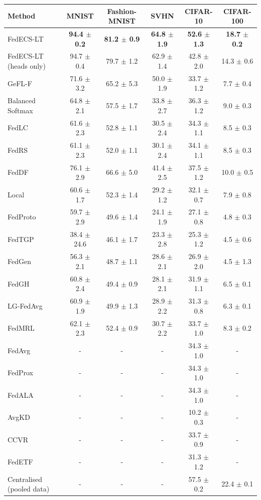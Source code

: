 \begin{tabular}{lccccc}
\toprule
Method & MNIST & Fashion-MNIST & SVHN & CIFAR-10 & CIFAR-100\\
\midrule
FedECS-LT & \textbf{94.4 $\pm$ 0.2} & \textbf{81.2 $\pm$ 0.9} & \textbf{64.8 $\pm$ 1.9} & \textbf{52.6 $\pm$ 1.3} & \textbf{18.7 $\pm$ 0.2}\\
FedECS-LT (heads only) & 94.7 $\pm$ 0.4 & 79.7 $\pm$ 1.2 & 62.9 $\pm$ 1.4 & 42.8 $\pm$ 2.0 & 14.3 $\pm$ 0.6\\
GeFL-F & 71.6 $\pm$ 3.2 & 65.2 $\pm$ 5.3 & 50.0 $\pm$ 1.9 & 33.7 $\pm$ 1.2 & 7.7 $\pm$ 0.4\\
Balanced Softmax & 64.8 $\pm$ 2.1 & 57.5 $\pm$ 1.7 & 33.8 $\pm$ 2.7 & 36.3 $\pm$ 1.2 & 9.0 $\pm$ 0.3\\
FedLC & 61.6 $\pm$ 2.3 & 52.8 $\pm$ 1.1 & 30.5 $\pm$ 2.4 & 34.3 $\pm$ 1.1 & 8.5 $\pm$ 0.3\\
FedRS & 61.1 $\pm$ 2.3 & 52.0 $\pm$ 1.1 & 30.1 $\pm$ 2.4 & 34.1 $\pm$ 1.1 & 8.5 $\pm$ 0.3\\
FedDF & 76.1 $\pm$ 2.9 & 66.6 $\pm$ 5.0 & 41.4 $\pm$ 2.5 & 37.5 $\pm$ 1.2 & 10.0 $\pm$ 0.5\\
Local & 60.6 $\pm$ 1.7 & 52.3 $\pm$ 1.4 & 29.2 $\pm$ 1.2 & 32.1 $\pm$ 0.7 & 7.9 $\pm$ 0.8\\
FedProto & 59.7 $\pm$ 2.9 & 49.6 $\pm$ 1.4 & 24.1 $\pm$ 1.9 & 27.1 $\pm$ 0.8 & 4.8 $\pm$ 0.3\\
FedTGP & 38.4 $\pm$ 24.6 & 46.1 $\pm$ 1.7 & 23.3 $\pm$ 2.8 & 25.3 $\pm$ 1.2 & 4.5 $\pm$ 0.6\\
FedGen & 56.3 $\pm$ 2.1 & 48.7 $\pm$ 1.1 & 28.6 $\pm$ 2.1 & 26.9 $\pm$ 2.0 & 4.5 $\pm$ 1.3\\
FedGH & 60.8 $\pm$ 2.4 & 49.4 $\pm$ 0.9 & 28.1 $\pm$ 2.1 & 31.9 $\pm$ 1.1 & 6.5 $\pm$ 0.1\\
LG-FedAvg & 60.9 $\pm$ 1.9 & 49.9 $\pm$ 1.3 & 28.9 $\pm$ 2.2 & 31.3 $\pm$ 0.8 & 6.3 $\pm$ 0.1\\
FedMRL & 62.1 $\pm$ 2.3 & 52.4 $\pm$ 0.9 & 30.7 $\pm$ 2.2 & 33.7 $\pm$ 1.0 & 8.3 $\pm$ 0.2\\
FedAvg & - & - & - & 34.3 $\pm$ 1.0 & -\\
FedProx & - & - & - & 34.3 $\pm$ 1.0 & -\\
FedALA & - & - & - & 34.3 $\pm$ 1.0 & -\\
AvgKD & - & - & - & 10.2 $\pm$ 0.3 & -\\
CCVR & - & - & - & 33.7 $\pm$ 0.9 & -\\
FedETF & - & - & - & 31.3 $\pm$ 1.2 & -\\
Centralised (pooled data) & - & - & - & 57.5 $\pm$ 0.2 & 22.4 $\pm$ 0.1\\
\bottomrule
\end{tabular}
